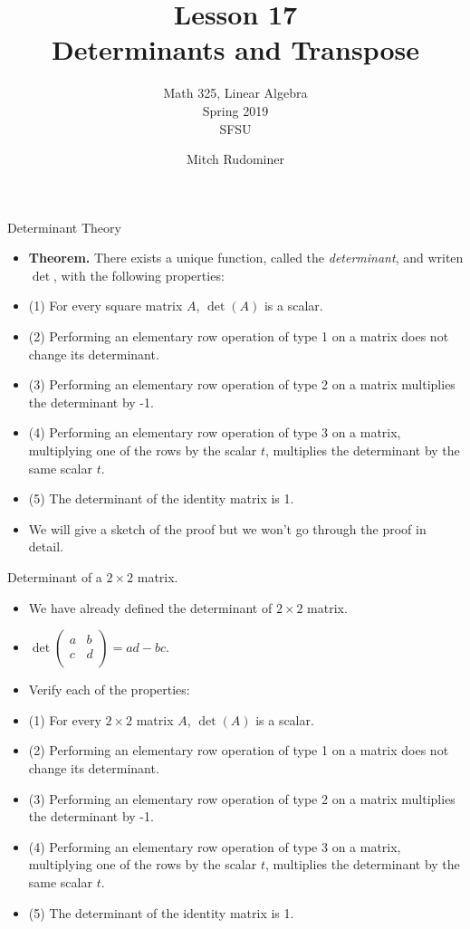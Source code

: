 \documentclass{beamer}
\title{Lesson 17 \\ Determinants and Transpose}
\subtitle{Math 325, Linear Algebra \\ Spring 2019 \\ SFSU}
\author{Mitch Rudominer}
\date{}
\begin{document}
\begin{frame}
  \titlepage
\end{frame}


\begin{frame}{Determinant Theory}

\begin{itemize}
\item \textbf{Theorem.} There exists a unique function, called the \emph{determinant}, and writen $\det$, with the following properties:
\item (1) For every square matrix $A$, $\det(A)$ is a scalar.
\item (2) Performing an elementary row operation of type 1 on a matrix does not change its determinant.
\item (3) Performing an elementary row operation of type 2 on a matrix multiplies the determinant by -1.
\item (4) Performing an elementary row operation of type 3 on a matrix, multiplying one of the rows by the scalar $t$,
multiplies the determinant by the same scalar $t$.
\item (5) The determinant of the identity matrix is 1.
\item We will give a sketch of the proof but we won't go through the proof in detail.
\end{itemize}
\end{frame}


\begin{frame}{Determinant of a $2\times 2$ matrix.}

\begin{itemize}
\item We have already defined the determinant of $2\times 2$ matrix.
\item
$
\det
\begin{pmatrix}
a & b \\
c & d \\
\end{pmatrix}
= ad - bc
$.
\item Verify each of the properties:
\item (1) For every $2\times 2$ matrix $A$, $\det(A)$ is a scalar.
\item (2) Performing an elementary row operation of type 1 on a matrix does not change its determinant.
\item (3) Performing an elementary row operation of type 2 on a matrix multiplies the determinant by -1.
\item (4) Performing an elementary row operation of type 3 on a matrix, multiplying one of the rows by the scalar $t$,
multiplies the determinant by the same scalar $t$.
\item (5) The determinant of the identity matrix is 1.
\end{itemize}
\end{frame}
\end{document}
